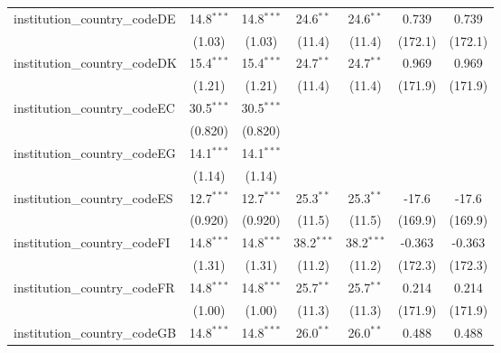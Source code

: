 \begin{tabular}{lcccccc}
   institution\_country\_codeDE          & 14.8$^{***}$  & 14.8$^{***}$  & 24.6$^{**}$   & 24.6$^{**}$   & 0.739         & 0.739\\   
                                         & (1.03)        & (1.03)        & (11.4)        & (11.4)        & (172.1)       & (172.1)\\   
   institution\_country\_codeDK          & 15.4$^{***}$  & 15.4$^{***}$  & 24.7$^{**}$   & 24.7$^{**}$   & 0.969         & 0.969\\   
                                         & (1.21)        & (1.21)        & (11.4)        & (11.4)        & (171.9)       & (171.9)\\   
   institution\_country\_codeEC          & 30.5$^{***}$  & 30.5$^{***}$  &               &               &               &   \\   
                                         & (0.820)       & (0.820)       &               &               &               &   \\   
   institution\_country\_codeEG          & 14.1$^{***}$  & 14.1$^{***}$  &               &               &               &   \\   
                                         & (1.14)        & (1.14)        &               &               &               &   \\   
   institution\_country\_codeES          & 12.7$^{***}$  & 12.7$^{***}$  & 25.3$^{**}$   & 25.3$^{**}$   & -17.6         & -17.6\\   
                                         & (0.920)       & (0.920)       & (11.5)        & (11.5)        & (169.9)       & (169.9)\\   
   institution\_country\_codeFI          & 14.8$^{***}$  & 14.8$^{***}$  & 38.2$^{***}$  & 38.2$^{***}$  & -0.363        & -0.363\\   
                                         & (1.31)        & (1.31)        & (11.2)        & (11.2)        & (172.3)       & (172.3)\\   
   institution\_country\_codeFR          & 14.8$^{***}$  & 14.8$^{***}$  & 25.7$^{**}$   & 25.7$^{**}$   & 0.214         & 0.214\\   
                                         & (1.00)        & (1.00)        & (11.3)        & (11.3)        & (171.9)       & (171.9)\\   
   institution\_country\_codeGB          & 14.8$^{***}$  & 14.8$^{***}$  & 26.0$^{**}$   & 26.0$^{**}$   & 0.488         & 0.488\\   

\end{tabular}
